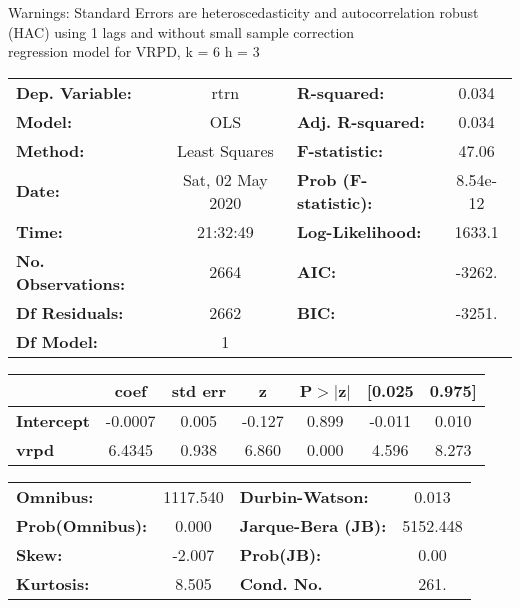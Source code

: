 Warnings: \newline
 [1] Standard Errors are heteroscedasticity and autocorrelation robust (HAC) using 1 lags and without small sample correction\\ 

regression model for VRPD, k = 6 h = 3\begin{center}
\begin{tabular}{lclc}
\toprule
\textbf{Dep. Variable:}    &       rtrn       & \textbf{  R-squared:         } &     0.034   \\
\textbf{Model:}            &       OLS        & \textbf{  Adj. R-squared:    } &     0.034   \\
\textbf{Method:}           &  Least Squares   & \textbf{  F-statistic:       } &     47.06   \\
\textbf{Date:}             & Sat, 02 May 2020 & \textbf{  Prob (F-statistic):} &  8.54e-12   \\
\textbf{Time:}             &     21:32:49     & \textbf{  Log-Likelihood:    } &    1633.1   \\
\textbf{No. Observations:} &        2664      & \textbf{  AIC:               } &    -3262.   \\
\textbf{Df Residuals:}     &        2662      & \textbf{  BIC:               } &    -3251.   \\
\textbf{Df Model:}         &           1      & \textbf{                     } &             \\
\bottomrule
\end{tabular}
\begin{tabular}{lcccccc}
                   & \textbf{coef} & \textbf{std err} & \textbf{z} & \textbf{P$> |$z$|$} & \textbf{[0.025} & \textbf{0.975]}  \\
\midrule
\textbf{Intercept} &      -0.0007  &        0.005     &    -0.127  &         0.899        &       -0.011    &        0.010     \\
\textbf{vrpd}      &       6.4345  &        0.938     &     6.860  &         0.000        &        4.596    &        8.273     \\
\bottomrule
\end{tabular}
\begin{tabular}{lclc}
\textbf{Omnibus:}       & 1117.540 & \textbf{  Durbin-Watson:     } &    0.013  \\
\textbf{Prob(Omnibus):} &   0.000  & \textbf{  Jarque-Bera (JB):  } & 5152.448  \\
\textbf{Skew:}          &  -2.007  & \textbf{  Prob(JB):          } &     0.00  \\
\textbf{Kurtosis:}      &   8.505  & \textbf{  Cond. No.          } &     261.  \\
\bottomrule
\end{tabular}
\end{center}

